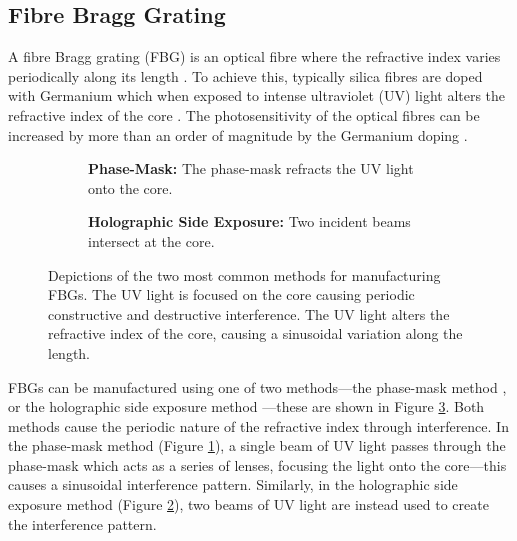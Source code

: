 \subsection{Fibre Bragg Grating}
A fibre Bragg grating (FBG) is an optical fibre where the refractive index varies periodically along its length \cite{ferreira}. To achieve this, typically silica fibres are doped with Germanium which when exposed to intense ultraviolet (UV) light alters the refractive index of the core \cite{becker, starodoumov}. The photosensitivity of the optical fibres can be increased by more than an order of magnitude by the Germanium doping \cite{becker, ferreira}. \\

\begin{figure}[p]
\centering
\begin{subfigure}{\textwidth}
\centering

\caption{\textbf{Phase-Mask:} The phase-mask refracts the UV light onto the core.}
\label{fig:phasemask}
\vspace{10mm}
\end{subfigure}
\begin{subfigure}{\textwidth}
\centering

\caption{\textbf{Holographic Side Exposure:} Two incident beams intersect at the core.}
\label{fig:holographic}
\end{subfigure}
\caption[Manufacture methods of fibre Bragg gratings.]{Depictions of the two most common methods for manufacturing FBGs. The UV light is focused on the core causing periodic constructive and destructive interference. The UV light alters the refractive index of the core, causing a sinusoidal variation along the length.}
\label{fig:fbgmake}
\end{figure}

FBGs can be manufactured using one of two methods---the phase-mask method \cite{agrawal2002, alazzawi, becker, starodoumov}, or the holographic side exposure method \cite{agrawal2002, alazzawi, becker, ferreira, starodoumov}---these are shown in Figure \ref{fig:fbgmake}. Both methods cause the periodic nature of the refractive index through interference. In the phase-mask method (Figure \ref{fig:phasemask}), a single beam of UV light passes through the phase-mask which acts as a series of lenses, focusing the light onto the core---this causes a sinusoidal interference pattern. Similarly, in the holographic side exposure method (Figure \ref{fig:holographic}), two beams of UV light are instead used to create the interference pattern. \\

